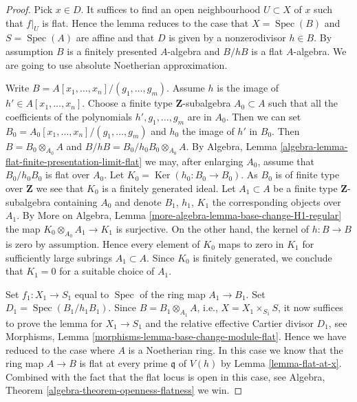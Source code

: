 \documentclass[10pt,a4paper]{amsart}
\theoremstyle{plain}
\theoremstyle{definition}
\theoremstyle{remark}
\numberwithin{equation}{subsection}
\def\Spec{\mathop{\mathrm{Spec}}}
\def\Ker{\mathop{\mathrm{Ker}}}
\begin{document}
\begin{proof}
Pick $x \in D$. It suffices to find an open neighbourhood $U \subset X$
of $x$ such that $f|_U$ is flat. Hence the lemma reduces to the case
that $X = \Spec(B)$ and $S = \Spec(A)$ are affine
and that $D$ is given by a nonzerodivisor $h \in B$. By assumption
$B$ is a finitely presented $A$-algebra and $B/hB$ is a flat
$A$-algebra. We are going to use absolute Noetherian approximation.

\medskip\noindent
Write $B = A[x_1, \ldots, x_n]/(g_1, \ldots, g_m)$. Assume
$h$ is the image of $h' \in A[x_1, \ldots, x_n]$. Choose a finite type
$\mathbf{Z}$-subalgebra $A_0 \subset A$ such that all the coefficients
of the polynomials $h', g_1, \ldots, g_m$ are in $A_0$. Then we can set
$B_0 = A_0[x_1, \ldots, x_n]/(g_1, \ldots, g_m)$ and $h_0$ the image
of $h'$ in $B_0$. Then $B = B_0 \otimes_{A_0} A$ and
$B/hB = B_0/h_0B_0 \otimes_{A_0} A$. By Algebra, Lemma
\ref{algebra-lemma-flat-finite-presentation-limit-flat}
we may, after enlarging $A_0$, assume that $B_0/h_0B_0$ is flat
over $A_0$. Let $K_0 = \Ker(h_0 : B_0 \to B_0)$.
As $B_0$ is of finite type over $\mathbf{Z}$ we see that $K_0$ is
a finitely generated ideal. Let $A_1 \subset A$ be a finite type
$\mathbf{Z}$-subalgebra containing $A_0$ and denote $B_1$, $h_1$, $K_1$
the corresponding objects over $A_1$. By
More on Algebra, Lemma \ref{more-algebra-lemma-base-change-H1-regular}
the map $K_0 \otimes_{A_0} A_1 \to K_1$ is surjective. On the other hand,
the kernel of $h : B \to B$ is zero by assumption. Hence every element
of $K_0$ maps to zero in $K_1$ for sufficiently large subrings
$A_1 \subset A$. Since $K_0$ is finitely generated, we conclude that
$K_1 = 0$ for a suitable choice of $A_1$.

\medskip\noindent
Set $f_1 : X_1 \to S_1$ equal to $\Spec$ of the
ring map $A_1 \to B_1$. Set $D_1 = \Spec(B_1/h_1B_1)$.
Since $B = B_1 \otimes_{A_1} A$, i.e., $X = X_1 \times_{S_1} S$,
it now suffices to prove the lemma for $X_1 \to S_1$ and the relative
effective Cartier divisor $D_1$, see
Morphisms, Lemma \ref{morphisms-lemma-base-change-module-flat}.
Hence we have reduced to the case where $A$ is a Noetherian ring.
In this case we know that the ring map $A \to B$ is flat at every
prime $\mathfrak q$ of $V(h)$ by
Lemma \ref{lemma-flat-at-x}.
Combined with the fact that the flat locus is open in this case, see
Algebra, Theorem \ref{algebra-theorem-openness-flatness}
we win.
\end{proof}
\end{document}
